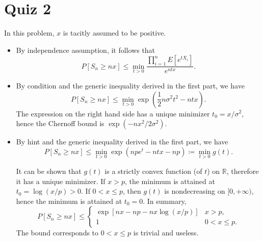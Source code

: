 \documentclass{article}
\newcommand{\real}{\mathbb{R}}
\theoremstyle{definition}
\theoremstyle{plain}
\theoremstyle{remark}
\begin{document}
\section*{Quiz 2}
In this problem, $x$ is tacitly assumed to be positive.
\begin{itemize}
    \item By independence assumption, it follows that
    \begin{equation*}
        P[S_n \geq nx] \leq \min_{t > 0} \frac{\prod\limits_{i = 1}^n E[e^{tX_i}]}{e^{ntx}}.
    \end{equation*}
    
    \item By condition and the generic inequality derived in the first part, we have
    \begin{equation*}
        P[S_n \geq nx] \leq \min_{t > 0} \exp\left(\frac{1}{2}n\sigma^2 t^2 - ntx\right).
    \end{equation*}
    The expression on the right hand side has a unique minimizer $t_0 = x/\sigma^2$,
    hence the Chernoff bound is $\boxed{\exp(-nx^2/2\sigma^2)}$.
    
    \item By hint and the generic inequality derived in the first part, we have
    \begin{equation*}
        P[S_n \geq nx] \leq \min_{t > 0} \exp\left(npe^t - ntx - np\right) 
        \coloneqq \min_{t > 0} g(t).
    \end{equation*}
    
    It can be shown that $g(t)$ is a strictly convex function (of $t$) on $\real$,
    therefore it has a unique minimizer. If $x > p$, the minimum is attained 
    at $t_0 = \log(x/p) > 0$. If $0 < x \leq p$, then $g(t)$ is nondecreasing on
    $[0, +\infty)$, hence the minimum is attained at $t_0 = 0$. In summary,
    \begin{equation*}
        P[S_n \geq nx] \leq 
        \begin{cases}
        \exp[nx - np - nx\log(x/p)] & x > p, \\[1em]
        1 & 0 < x \leq p.
        \end{cases}
    \end{equation*}
    The bound corresponds to $0 < x \leq p$ is trivial and useless.
\end{itemize}

\newpage
\end{document}
